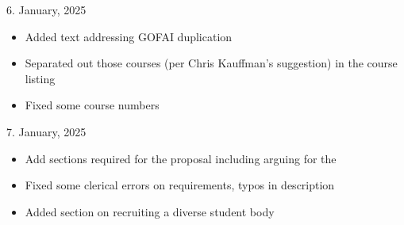 6. January, 2025

\begin{itemize}
    \item Added text addressing GOFAI duplication
    \item Separated out those courses (per Chris Kauffman's suggestion) in the course listing
    \item Fixed some course numbers
\end{itemize}

7. January, 2025

\begin{itemize}
    \item Add sections required for the  proposal including arguing for the 
    \item Fixed some clerical errors on requirements, typos in description
    \item Added section on recruiting a diverse student body
\end{itemize}

